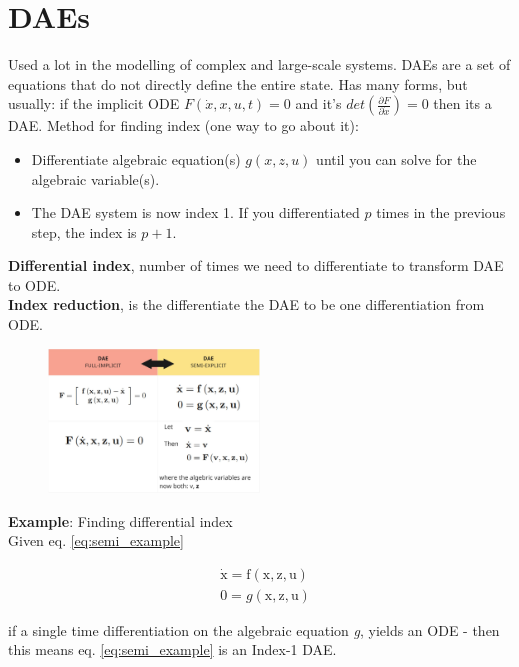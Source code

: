 \section{DAEs}
Used a lot in the modelling of complex and large-scale systems. DAEs are a set of equations that do not directly define the entire state. Has many forms, but usually: if the implicit ODE $F(\dot{x}, x, u, t)=0$ and it's $det(\frac{\partial F}{\partial \dot{x}}) = 0$ then its a DAE. Method for finding index (one way to go about it):
\begin{itemize}
    \item Differentiate algebraic equation(s) $g(x, z, u)$ until you can solve for the algebraic variable(s).
    \item The DAE system is now index 1. If you differentiated $p$ times in the previous step, the index is $p+1$.
\end{itemize}
\textbf{Differential index}, number of times we need to differentiate to transform DAE to ODE.\\
\textbf{Index reduction}, is the differentiate the DAE to be one differentiation from ODE.
\begin{figure}[H]
    \centering
    \includegraphics[width=0.5\textwidth]{images/dae_full_vs_semi.jpg}
    \label{fig:dae_exp}
\end{figure}

\textbf{Example}: Finding differential index \\
Given eq. \ref{eq:semi_example}

\begin{equation} \label{eq:semi_example}
    \begin{aligned}
        &\dot{\mathrm{x}}=\mathrm{f}(\mathrm{x}, \mathrm{z}, \mathrm{u}) \\
        &0=g(\mathrm{x}, \mathrm{z}, \mathrm{u})
    \end{aligned}
\end{equation}

if a single time differentiation on the algebraic equation \textit{g}, yields an ODE - then this means eq. \ref{eq:semi_example} is an Index-1 DAE.
\hfill \break

